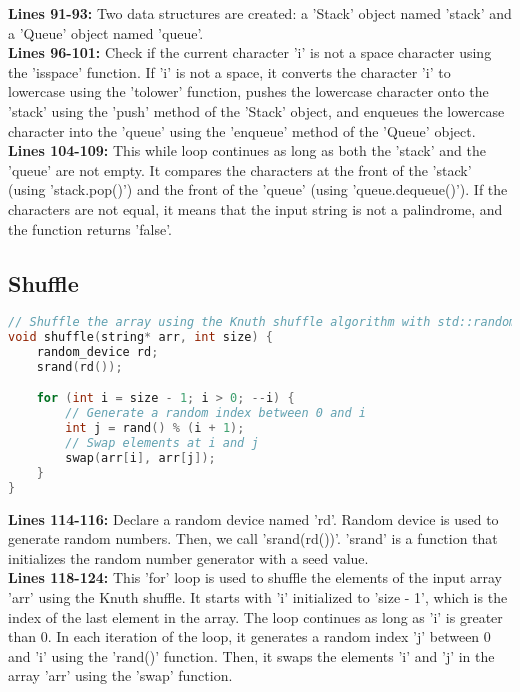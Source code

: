 \documentclass[letterpaper, 10pt,DIV=13]{scrartcl}
\numberwithin{equation}{section} %
\numberwithin{figure}{section} %
\numberwithin{table}{section} %
\begin{document}
\textbf{Lines 91-93:} Two data structures are created: a 'Stack' object named 'stack' and a 'Queue' object named 'queue'. \\
\textbf{Lines 96-101:} Check if the current character 'i' is not a space character using the 'isspace' function. If 'i' is not a space, it converts the character 'i' to lowercase using the 'tolower' function, pushes the lowercase character onto the 'stack' using the 'push' method of the 'Stack' object, and enqueues the lowercase character into the 'queue' using the 'enqueue' method of the 'Queue' object. \\
\textbf{Lines 104-109:} This while loop continues as long as both the 'stack' and the 'queue' are not empty. It compares the characters at the front of the 'stack' (using 'stack.pop()') and the front of the 'queue' (using 'queue.dequeue()'). If the characters are not equal, it means that the input string is not a palindrome, and the function returns 'false'.

\subsection{Shuffle}
\begin{linenumbers}
\begin{lstlisting}[language=C++, caption={Shuffle}, label={code:example}]
// Shuffle the array using the Knuth shuffle algorithm with std::random_device seeding
void shuffle(string* arr, int size) {
    random_device rd;
    srand(rd());

    for (int i = size - 1; i > 0; --i) {
        // Generate a random index between 0 and i
        int j = rand() % (i + 1); 
        // Swap elements at i and j
        swap(arr[i], arr[j]);     
    }
}
\end{lstlisting}
\end{linenumbers}
\nolinenumbers

\textbf{Lines 114-116:} Declare a random device named 'rd'. Random device is used to generate random numbers. Then, we call 'srand(rd())'. 'srand' is a function that initializes the random number generator with a seed value. \\
\textbf{Lines 118-124:} This 'for' loop is used to shuffle the elements of the input array 'arr' using the Knuth shuffle. It starts with 'i' initialized to 'size - 1', which is the index of the last element in the array. The loop continues as long as 'i' is greater than 0. In each iteration of the loop, it generates a random index 'j' between 0 and 'i' using the 'rand()' function. Then, it swaps the elements 'i' and 'j' in the array 'arr' using the 'swap' function.
\end{document}
